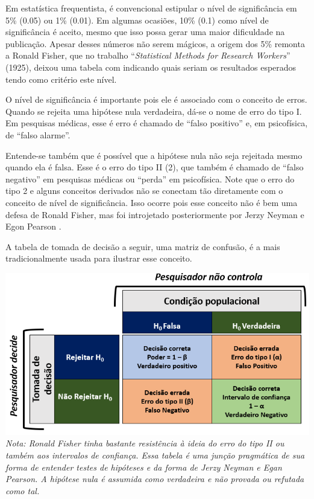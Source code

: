 \documentclass[
]{book}
\begin{document}
Em estatística frequentista, é convencional estipular o nível de significância em 5\% (0.05) ou 1\% (0.01). Em algumas ocasiões, 10\% (0.1) como nível de significância é aceito, mesmo que isso possa gerar uma maior dificuldade na publicação. Apesar desses números não serem mágicos, a origem dos 5\% remonta a Ronald Fisher, que no trabalho ``\emph{Statistical Methods for Research Workers}'' (1925), deixou uma tabela com indicando quais seriam os resultados esperados tendo como critério este nível.

O nível de significância é importante pois ele é associado com o conceito de erros. Quando se rejeita uma hipótese nula verdadeira, dá-se o nome de erro do tipo I. Em pesquisas médicas, esse é erro é chamado de ``falso positivo'' e, em psicofísica, de ``falso alarme''.

Entende-se também que é possível que a hipótese nula não seja rejeitada mesmo quando ela é falsa. Esse é o erro do tipo II (2), que também é chamado de ``falso negativo'' em pesquisas médicas ou ``perda'' em psicofísica. Note que o erro do tipo 2 e alguns conceitos derivados não se conectam tão diretamente com o conceito de nível de significância. Isso ocorre pois esse conceito não é bem uma defesa de Ronald Fisher, mas foi introjetado posteriormente por Jerzy Neyman e Egon Pearson \citep{cohen2013explaining}.

A tabela de tomada de decisão a seguir, uma matriz de confusão, é a mais tradicionalmente usada para ilustrar esse conceito.

\includegraphics{./img/cap_inferencia_tabela_decisao.png}
\emph{Nota: Ronald Fisher tinha bastante resistência à ideia do erro do tipo II ou também aos intervalos de confiança. Essa tabela é uma junção pragmática de sua forma de entender testes de hipóteses e da forma de Jerzy Neyman e Egan Pearson. A hipótese nula é assumida como verdadeira e não provada ou refutada como tal.}
\end{document}
